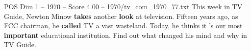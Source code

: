 \begin{textsample}{POS Dim 1 – 1970 – Score 4.00 – 1970/tv\_com\_1970\_77.txt}  \label{ex:f1_pos_040}
This week in TV Guide, Newton Minow \textbf{takes} another \textbf{look} at television.
Fifteen years ago, as FCC chairman, he \textbf{called} TV a vast wasteland.
Today, he thinks it 's our most \textbf{important} educational institution.
Find out what changed his mind and why in TV Guide.

\end{textsample}
